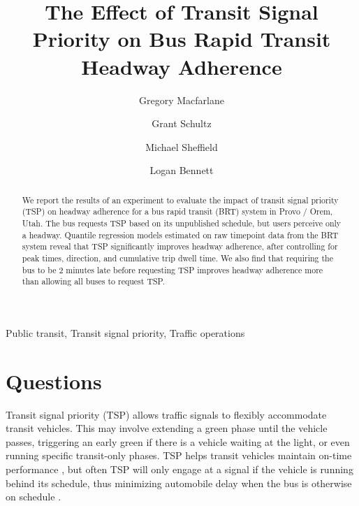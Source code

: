 \documentclass[3p, authoryear, review]{elsarticle} %
\begin{document}
\begin{frontmatter}

  \title{The Effect of Transit Signal Priority on Bus Rapid Transit Headway Adherence}
    \author[BYU]{Gregory Macfarlane}
    \author[BYU]{Grant Schultz}
    \author[WCG]{Michael Sheffield}
    \author[BYU]{Logan Bennett}
      \address[BYU]{Brigham Young University, Civil and Environmental Engineering Department, 430 Engineering Building, Provo, Utah 84602}
    \address[WCG]{Wall Consultant Group, 9980 S 300 W Ste 200 Sandy, UT 84070}
  
  \begin{abstract}
  We report the results of an experiment to evaluate the impact of transit signal priority (TSP) on headway adherence for a bus rapid transit (BRT) system in Provo / Orem, Utah. The bus requests TSP based on its unpublished schedule, but users perceive only a headway. Quantile regression models estimated on raw timepoint data from the BRT system reveal that TSP significantly improves headway adherence, after controlling for peak times, direction, and cumulative trip dwell time. We also find that requiring the bus to be 2 minutes late before requesting TSP improves headway adherence more than allowing all buses to request TSP.
  \end{abstract}
   \begin{keyword} Public transit, Transit signal priority, Traffic operations\end{keyword}
 \end{frontmatter}

\hypertarget{intro}{%
\section{Questions}\label{intro}}

Transit signal priority (TSP) allows traffic signals to flexibly accommodate
transit vehicles. This may involve extending a green phase until the vehicle
passes, triggering an early green if there is a vehicle waiting at the light, or
even running specific transit-only phases. TSP helps transit vehicles maintain
on-time performance \citep{sheffieldsensitivity, Liu2018}, but often TSP will only engage at a signal if
the vehicle is running behind its schedule, thus minimizing automobile delay
when the bus is otherwise on schedule \citep{NI20201}.
\end{document}
